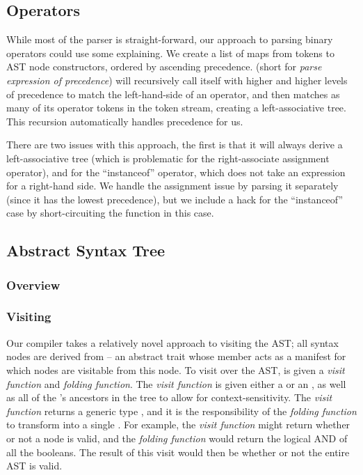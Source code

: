 \documentclass{article}
\begin{document}
\subsection{Operators}

While most of the parser is straight-forward, our approach to parsing binary operators could use some explaining. We
create a list of maps from tokens to AST node constructors, ordered by ascending precedence.  (short
for \emph{parse expression of precedence}) will recursively call itself with higher and higher levels of precedence to
match the left-hand-side of an operator, and then matches as many of its operator tokens in the token stream, creating a
left-associative tree. This recursion automatically handles precedence for us.

There are two issues with this approach, the first is that it will always derive a left-associative tree (which is
problematic for the right-associate assignment operator), and for the ``instanceof'' operator, which does not take an
expression for a right-hand side. We handle the assignment issue by parsing it separately (since it has the lowest
precedence), but we include a hack for the ``instanceof'' case by short-circuiting the function in this case.




\subsection{Abstract Syntax Tree}

\subsubsection{Overview}

\subsubsection{Visiting}

Our compiler takes a relatively novel approach to visiting the AST; all syntax nodes are derived from 
-- an abstract trait whose \value{children} member acts as a manifest for which nodes are visitable from this node. To
visit over the AST,  is given a \textit{visit function} and \textit{folding function}. The \textit{visit
function} is given either a \value{Before(Node)} or an \value{After(Node)}, as well as all of the \value{Node}'s
ancestors in the tree to allow for context-sensitivity. The \textit{visit function} returns a generic type ,
and it is the responsibility of the \textit{folding function} to transform  into a single . For
example, the \textit{visit function} might return whether or not a node is valid, and the \textit{folding function}
would return the logical AND of all the booleans. The result of this visit would then be whether or not the entire AST
is valid.
\end{document}
